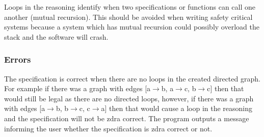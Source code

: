 Loops in the reasoning identify when two specifications or functions can call
one another (mutual recursion). This should be avoided when writing safety critical systems because
a system which has mutual recursion could possibly overload the stack and the
software will crash.

\subsubsection{Errors}
\label{subsubsec:zdra_looperrors}

The specification is correct when there are no loops in the created directed
graph. For example if there was a graph with edges [a$\rightarrow$b,
a$\rightarrow$c, b$\rightarrow$c] then that would still be legal as there are no
directed loops, however, if there was a graph with edges [a$\rightarrow$b,
b$\rightarrow$c, c$\rightarrow$a] then that would cause a loop in the reasoning
and the specification will not be \gls{zdra} correct. The program outputs a
message informing the user whether the specification is \gls{zdra} correct or
not.

